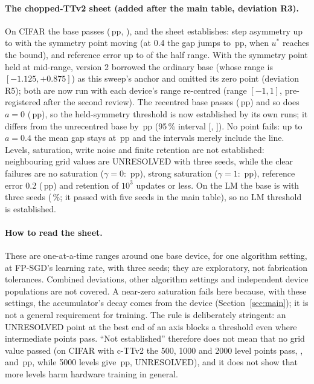 \paragraph{The chopped-TTv2 sheet (added after the main table, deviation R3).} On CIFAR the base passes
(\RVSpecCttvTwoCifarBaseGap\,pp, \RVSpecCttvTwoCifarBaseLabel), and the sheet establishes: step asymmetry up to
\RVSpecCttvTwoCifarAsymThr{} with the symmetry point moving (at 0.4 the gap jumps to \RVSpecCttvTwoCifarAsymAtZeroPFourGap\,pp,
when $u^*$ reaches the bound), and reference error up to \RVSpecCttvTwoCifarRefErrThr{} of the half range. With the symmetry point
held at mid-range, version 2 borrowed the ordinary base (whose range is $[-1.125, +0.875]$) as this sweep's anchor and omitted
its zero point (deviation R5); both are now run with each device's range re-centred (range $[-1, 1]$, pre-registered after the
second review). The recentred base passes (\RVSpecCttvTwoCifarAsymFixedspAtZeroPZeroFiveGap\,pp) and so does $a=0$
(\RVSpecCttvTwoCifarAsymFixedspAtZeroPZeroGap\,pp), so the held-symmetry threshold \RVSpecCttvTwoCifarAsymFixedspThr{} is now
established by its own runs; it differs from the unrecentred base by \RXFixCttvTwoCifarRmu\,pp (95\,\% interval
[\RXFixCttvTwoCifarRmuLo, \RXFixCttvTwoCifarRmuHi]). No point fails: up to $a=0.4$ the mean gap stays at
\RVSpecCttvTwoCifarAsymFixedspAtZeroPFourGap\,pp and the intervals merely include the line. Levels,
saturation, write noise and finite retention are not established: neighbouring grid values are UNRESOLVED with three seeds,
while the clear failures are no saturation ($\gamma=0$: \RVSpecCttvTwoCifarGammaAtZeroPZeroGap\,pp), strong saturation
($\gamma=1$: \RVSpecCttvTwoCifarGammaAtOnePZeroGap\,pp), reference error 0.2 (\RVSpecCttvTwoCifarRefErrAtZeroPTwoGap\,pp) and
retention of $10^3$ updates or less. On the LM the base is \RVSpecCttvTwoLmBaseLabel{} with three seeds
(\RVSpecCttvTwoLmBaseGap\,\%; it passed with five seeds in the main table), so no LM threshold is established.

\paragraph{How to read the sheet.} These are one-at-a-time ranges around one base device, for one algorithm setting, at FP-SGD's
learning rate, with three seeds; they are exploratory, not fabrication tolerances. Combined deviations, other algorithm
settings and independent device populations are not covered. A near-zero saturation fails here because, with these settings,
the accumulator's decay comes from the device (Section~\ref{sec:main}); it is not a general requirement for training. The rule
is deliberately stringent: an UNRESOLVED point at the best end of an axis blocks a threshold even where intermediate points pass.
``Not established'' therefore does not mean that no grid value passed (on CIFAR with c-TTv2 the 500, 1000 and 2000 level points
pass, \RVSpecCttvTwoCifarNStatesAtFiveZeroZeroPZeroGap, \RVSpecCttvTwoCifarNStatesAtOneZeroZeroZeroGap{} and
\RVSpecCttvTwoCifarNStatesAtTwoZeroZeroZeroPZeroGap\,pp, while 5000 levels give \RVSpecCttvTwoCifarNStatesAtFiveZeroZeroZeroPZeroGap\,pp,
UNRESOLVED), and it does not show that more levels harm hardware training in general.


